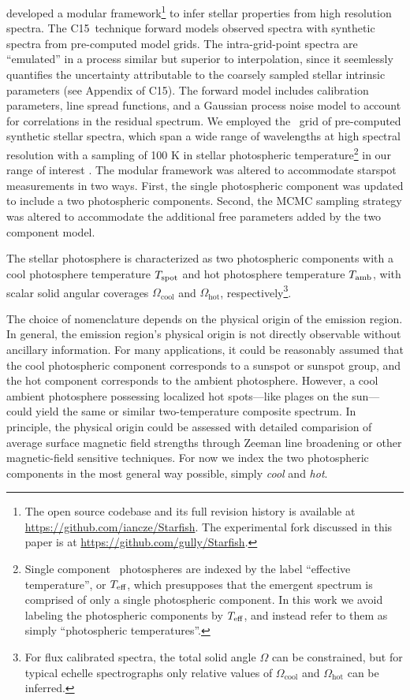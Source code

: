 \documentclass[twocolumn]{emulateapj}%
\newcommand{\iancze}{{\sc C15}}
\begin{document}
\citet[hereafter \iancze]{czekala15} developed a modular framework\footnote{The open source codebase and its full revision history is available at \url{https://github.com/iancze/Starfish}.  The experimental fork discussed in this paper is at \url{https://github.com/gully/Starfish}.  } to infer stellar properties from high resolution spectra.  The \iancze\ technique forward models observed spectra with synthetic spectra from pre-computed model grids.  The intra-grid-point spectra are ``emulated'' in a process similar but superior to interpolation, since it seemlessly quantifies the uncertainty attributable to the coarsely sampled stellar intrinsic parameters (see Appendix of \iancze).  The forward model includes calibration parameters, line spread functions, and a Gaussian process noise model to account for correlations in the residual spectrum.  We employed the \PHOENIX\ grid of pre-computed synthetic stellar spectra, which span a wide range of wavelengths at high spectral resolution with a sampling of 100 K in stellar photospheric temperature\footnote{Single component \PHOENIX\ photospheres are indexed by the label ``effective temperature'', or $T_\textrm{eff}$, which presupposes that the emergent spectrum is comprised of only a single photospheric component.  In this work we avoid labeling the photospheric components by $T_\textrm{eff}$, and instead refer to them as simply ``photospheric temperatures''.} in our range of interest \citep{husser13}.  The modular framework was altered to accommodate starspot measurements in two ways. First, the single photospheric component was updated to include a two photospheric components.  Second, the MCMC sampling strategy was altered to accommodate the additional free parameters added by the two component model.  

The stellar photosphere is characterized as two photospheric components with a cool photosphere temperature $T_\textrm{spot}$ and hot photosphere temperature $T_\textrm{amb}$, with scalar solid angular coverages $\Omega_{\mathrm{cool}}$ and $\Omega_{\mathrm{hot}}$, respectively\footnote{For flux calibrated spectra, the total solid angle $\Omega$ can be constrained, but for typical echelle spectrographs only relative values of $\Omega_{\mathrm{cool}}$ and $\Omega_{\mathrm{hot}}$ can be inferred.}.  

The choice of nomenclature depends on the physical origin of the emission region.  In general, the emission region's physical origin is not directly observable without ancillary information.  For many applications, it could be reasonably assumed that the cool photospheric component corresponds to a sunspot or sunspot group, and the hot component corresponds to the ambient photosphere.  However, a cool ambient photosphere possessing localized hot spots---like plages on the sun---could yield the same or similar two-temperature composite spectrum.  In principle, the physical origin could be assessed with detailed comparision of average surface magnetic field strengths through Zeeman line broadening or other magnetic-field sensitive techniques.  For now we index the two photospheric components in the most general way possible, simply \emph{cool} and \emph{hot}. 
\end{document}
